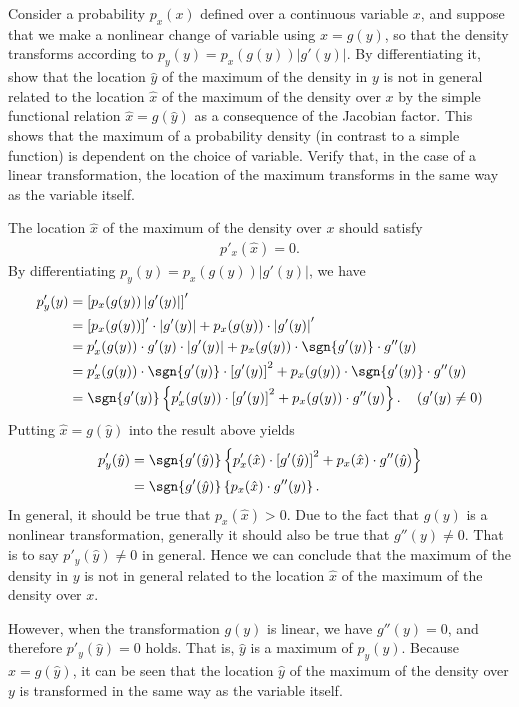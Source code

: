 \begin{question}{1.4}
	Consider a probability $p_x(x)$ defined over a continuous variable $x$, and suppose that we make a nonlinear change of variable using $x = g(y)$, so that the density transforms according to $p_y(y) = p_x(g(y))\left| g'(y) \right|$. By differentiating it, show that the location $\hat{y}$ of the maximum of the density in $y$ is not in general related to the location $\hat{x}$ of the maximum of the density over $x$ by the simple functional relation $\hat{x} = g(\hat{y})$ as a consequence of the Jacobian factor. This shows that the maximum of a probability density (in contrast to a simple function) is dependent on the choice of variable. Verify that, in the case of a linear transformation, the location of the maximum transforms in the same way as the variable itself.
\end{question}

\begin{answer}{}
	The location $\hat{x}$ of the maximum of the density over $x$ should satisfy
	\begin{align}
		p'_x(\hat{x}) = 0.
	\end{align}
	By differentiating $p_y(y) = p_x(g(y))\left| g'(y) \right|$, we have
	\begin{align}
		p'_y(y) &= \left[p_x(g(y))\left| g'(y) \right|\right]'\\
		&= \left[p_x(g(y))\right]'\cdot \left| g'(y) \right| + p_x(g(y)) \cdot \left| g'(y) \right|'\\
		&= p'_x(g(y)) \cdot g'(y) \cdot  \left| g'(y) \right| + p_x(g(y)) \cdot \sgn{g'(y)} \cdot g''(y)\\
		&= p'_x(g(y)) \cdot \sgn{g'(y)} \cdot \left[g'(y)\right]^2 + p_x(g(y)) \cdot \sgn{g'(y)} \cdot g''(y)\\
		&= \sgn{g'(y)} \left\{ p'_x(g(y))\cdot\left[g'(y)\right]^2 + p_x(g(y)) \cdot  g''(y) \right\}. \quad\left(g'(y) \neq 0\right)
	\end{align}
	Putting $\hat{x} = g(\hat{y})$ into the result above yields
	\begin{align}
		p'_y(\hat{y}) &= \sgn{g'(\hat{y})} \left\{ p'_x(\hat{x})\cdot\left[g'(\hat{y})\right]^2 + p_x(\hat{x}) \cdot  g''(\hat{y}) \right\}\\
		&= \sgn{g'(\hat{y})} \left\{ p_x(\hat{x}) \cdot  g''(y) \right\}.
	\end{align}
	In general, it should be true that $ p_x(\hat{x}) > 0$. Due to the fact that $g(y)$ is a nonlinear transformation, generally it should also be true that $g''(y) \neq 0$. That is to say $p'_y(\hat{y}) \neq 0$ in general. Hence we can conclude that the maximum of the density in $y$ is not in general related to the location $\hat{x}$ of the maximum of the density over $x$.
	
	However, when the transformation $g(y)$ is linear, we have $g''(y) = 0$, and therefore $p'_y(\hat{y}) = 0$ holds. That is, $\hat{y}$ is a maximum of $p_y(y)$. Because $\hat{x} = g(\hat{y})$, it can be seen that the location $\hat{y}$ of the maximum of the density over $y$ is transformed in the same way as the variable itself.
\end{answer}
